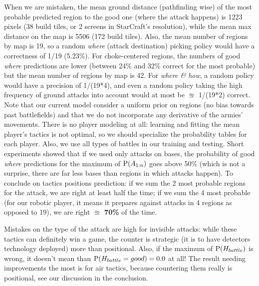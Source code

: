When we are mistaken, the mean ground distance (pathfinding wise) of the most probable predicted region to the good one (where the attack happens) is 1223 pixels (38 build tiles, or 2 screens in StarCraft's resolution), while the mean max distance on the map is 5506 (172 build tiles). Also, the mean number of regions by map is 19, so a random \textit{where} (attack destination) picking policy would have a correctness of 1/19 (5.23\%). For choke-centered regions, the numbers of good \textit{where} predictions are lower (between 24\% and 32\% correct for the most probable) but the mean number of regions by map is 42. For \textit{where \& how}, a random policy would have a precision of 1/(19*4), and even a random policy taking the high frequency of ground attacks into account would at most be $\approxeq$ 1/(19*2) correct.
Note that our current model consider a uniform prior on regions (no bias towards past battlefields) and that we do not incorporate any derivative of the armies' movements. There is no player modeling at all: learning and fitting the mean player's tactics is not optimal, so we should specialize the probability tables for each player. Also, we use all types of battles in our training and testing. Short experiments showed that if we used only attacks on bases, the probability of good \textit{where} predictions for the maximum of $\mathrm{P}(A_{1:n})$ goes above 50\% (which is not a surprise, there are far less bases than regions in which attacks happen). To conclude on tactics positions prediction: if we sum the 2 most probable regions for the attack, we are right at least half the time; if we sum the 4 most probable (for our robotic player, it means it prepares against attacks in 4 regions as opposed to 19), we are right \textbf{$\approxeq$ 70\%} of the time.

Mistakes on the type of the attack are high for invisible attacks: while these tactics can definitely win a game, the counter is strategic (it is to have detectors technology deployed) more than positional. Also, if the maximum of $\mathrm{P}(H_{battle})$ is wrong, it doesn't mean than $\mathrm{P}(H_{battle}=good)=0.0$ at all! The result needing improvements the most is for air tactics, because countering them really is positional, see our discussion in the conclusion.

